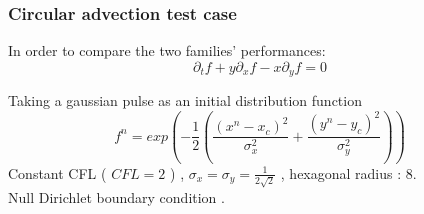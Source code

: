 \documentclass[]{beamer}
\begin{document}
\begin{frame}
	\frametitle{Circular advection test case}
	
	In order to compare the two families' performances:
	\begin{equation}
		\partial_t f + y\partial_x f - x \partial_y f = 0 
	\end{equation}
	
	Taking a gaussian pulse as an initial distribution function
	\begin{equation}
	 f^{n} = exp  \left( -\dfrac{1}{2} \left( \dfrac{(x^n - x_c)^2}{\sigma_x^2} + \dfrac{(y^n - y_c)^2}{\sigma_y^2  } \right)   \right ) 
	\end{equation}
	Constant CFL (	$CFL = 2$ )  ,  $\sigma_x = \sigma_y = \frac{1}{2\sqrt{2}}$ , hexagonal radius : 8. \\
	Null Dirichlet boundary condition .
	

\end{frame}
\end{document}
